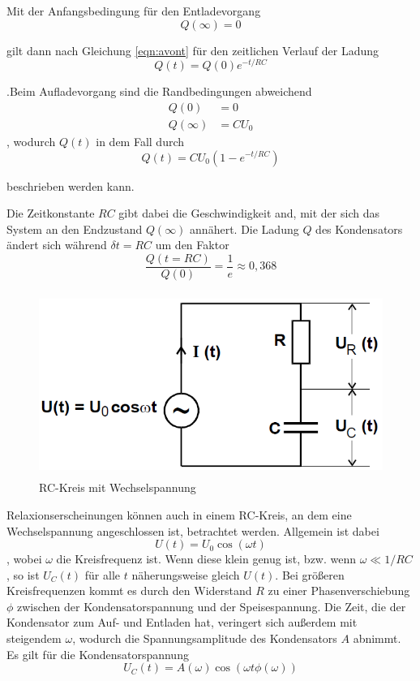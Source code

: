Mit der Anfangsbedingung für den Entladevorgang
\begin{equation}
    Q(\infty) = 0
\end{equation}

gilt dann nach Gleichung \ref{eqn:avont} für den zeitlichen Verlauf der Ladung
\begin{equation}
    Q(t) = Q(0) e^{-t/{RC}}
\end{equation}

.Beim Aufladevorgang sind die Randbedingungen abweichend
\begin{align*}
    Q(0)        &= 0 \\
    Q(\infty)   &= CU_0 
\end{align*}, wodurch $Q(t)$ in dem Fall durch
\begin{equation}
    Q(t) = CU_0 (1 - e^{-t/{RC}})
\end{equation}

beschrieben werden kann.

Die Zeitkonstante $RC$ gibt dabei die Geschwindigkeit and, mit der sich das System 
an den Endzustand $Q(\infty)$ annähert. Die Ladung $Q$ des Kondensators ändert sich während $\delta t=RC$ um
den Faktor
\begin{equation*}
    \frac{Q(t=RC)}{Q(0)} = \frac{1}e \approx 0,368 
\end{equation*} 


\begin{figure}
    \centering
    \includegraphics[height=6cm]{data/bild_2}
    \caption{RC-Kreis mit Wechselspannung}
    \label{fig:bild_2}
\end{figure}
\FloatBarrier
Relaxionserscheinungen können auch in einem RC-Kreis, an dem eine Wechselspannung angeschlossen ist, betrachtet werden. 
Allgemein ist dabei \begin{equation}
    U(t) = U_0 \cos(\omega t)
\end{equation}, wobei $\omega$ die Kreisfrequenz ist. Wenn diese klein genug ist, bzw. wenn $\omega \ll 1/RC$, so ist $U_C (t)$
für alle $t$ näherungsweise gleich $U(t)$. Bei größeren Kreisfrequenzen kommt es durch den Widerstand $R$ zu einer Phasenverschiebung
$\phi$ zwischen der Kondensatorspannung und der Speisespannung. Die Zeit, die der Kondensator zum Auf- und Entladen hat, veringert sich 
außerdem mit steigendem $\omega$, wodurch die Spannungsamplitude des Kondensators $A$ abnimmt. Es gilt für die Kondensatorspannung 
\begin{equation}
    U_C (t) = A(\omega) \cos(\omega t \phi(\omega))
\end{equation}

